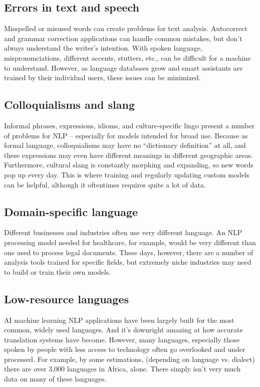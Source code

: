 \documentclass[11pt]{article}
\begin{document}
\subsection{Errors in text and speech}
\label{sec:org3e81afa}
Misspelled or misused words can create problems for text analysis. Autocorrect and
grammar correction applications can handle common mistakes, but don’t always
understand the writer’s intention.
With spoken language, mispronunciations, different accents, stutters, etc., can
be difficult for a machine to understand. However, as language databases grow and
smart assistants are trained by their individual users, these issues can be minimized.
\subsection{Colloquialisms and slang}
\label{sec:orgf8fa94e}
Informal phrases, expressions, idioms, and culture-specific lingo present a number
of problems for NLP – especially for models intended for broad use. Because as formal
language, colloquialisms may have no “dictionary definition” at all, and these
expressions may even have different meanings in different geographic areas.
Furthermore, cultural slang is constantly morphing and expanding, so new words
pop up every day.
This is where training and regularly updating custom models can be helpful,
although it oftentimes requires quite a lot of data.
\subsection{Domain-specific language}
\label{sec:org39c9078}
Different businesses and industries often use very different language. An NLP
processing model needed for healthcare, for example, would be very different than
one used to process legal documents. These days, however, there are a number of
analysis tools trained for specific fields, but extremely niche industries may need
to build or train their own models.
\subsection{Low-resource languages}
\label{sec:org97807f0}
AI machine learning NLP applications have been largely built for the most common,
widely used languages. And it’s downright amazing at how accurate translation systems
have become. However, many languages, especially those spoken by people with less
access to technology often go overlooked and under processed. For example, by some
estimations, (depending on language vs. dialect) there are over 3,000 languages in
Africa, alone. There simply isn’t very much data on many of these languages.
\end{document}
